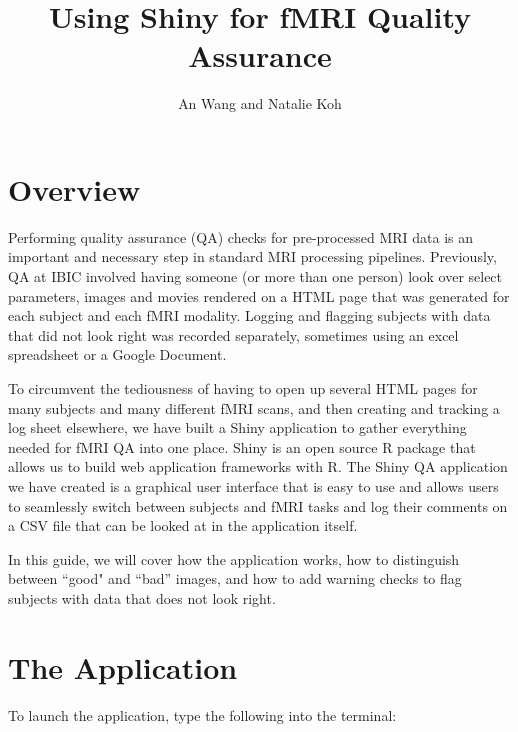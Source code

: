\documentclass[12pt]{article}
\title{Using Shiny for fMRI Quality Assurance}
\author{An Wang and Natalie Koh}
\begin{document}
	
	\maketitle

\section{Overview}

Performing quality assurance (QA) checks for pre-processed MRI data is an important and necessary step in standard MRI processing pipelines. Previously, QA at IBIC involved having someone (or more than one person) look over select parameters, images and movies rendered on a HTML page that was generated for each subject and each fMRI modality. Logging and flagging subjects with data that did not look right was recorded separately, sometimes using an excel spreadsheet or a Google Document. 

To circumvent the tediousness of having to open up several HTML pages for many subjects and many different fMRI scans, and then creating and tracking a log sheet elsewhere, we have built a Shiny application to gather everything needed for fMRI QA into one place. Shiny is an open source R package that allows us to build web application frameworks with R. The Shiny QA application we have created is a graphical user interface that is easy to use and allows users to seamlessly switch between subjects and fMRI tasks and log their comments on a CSV file that can be looked at in the application itself.

In this guide, we will cover how the application works, how to distinguish between ``good" and ``bad'' images, and how to add warning checks to flag subjects with data that does not look right.

\section{The Application}

To launch the application, type the following into the terminal:
\end{document}
